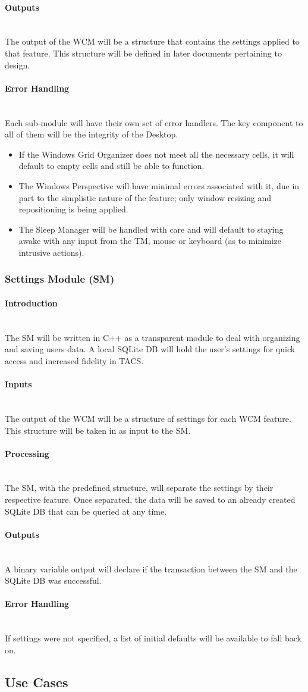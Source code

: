 \documentclass[titlepage]{article}
\newcommand{\myparagraph}[1]{\paragraph{#1}\mbox{}\\}
\begin{document}
\myparagraph{Outputs}
The output of the WCM will be a structure that contains the settings applied to that feature. This structure will be defined in later documents pertaining to design.

\myparagraph{Error Handling}
Each sub-module will have their own set of error handlers. The key component to all of them will be the integrity of the Desktop. 
\begin{itemize}
	\item If the Windows Grid Organizer does not meet all the necessary cells, it will default to empty cells and still be able to function.
	\item The Windows Perspective will have minimal errors associated with it, due in part to the simplistic nature of the feature; only window resizing and repositioning is being applied. 
	\item The Sleep Manager will be handled with care and will default to staying awake with any input from the TM, mouse or keyboard (as to minimize intrusive actions).
\end{itemize}

\subsubsection{Settings Module (SM)}

\myparagraph{Introduction}
The SM will be written in C++ as a transparent module to deal with organizing and saving users data. A local SQLite DB will hold the user's settings for quick access and increased fidelity in TACS.

\myparagraph{Inputs}
The output of the WCM will be a structure of settings for each WCM feature. This structure will be taken in as input to the SM.

\myparagraph{Processing}
The SM, with the predefined structure, will separate the settings by their respective feature. Once separated, the data will be saved to an already created SQLite DB that can be queried at any time.

\myparagraph{Outputs}
A binary variable output will declare if the transaction between the SM and the SQLite DB was successful.

\myparagraph{Error Handling}
If settings were not specified, a list of initial defaults will be available to fall back on.

\subsection{Use Cases}
\end{document}

